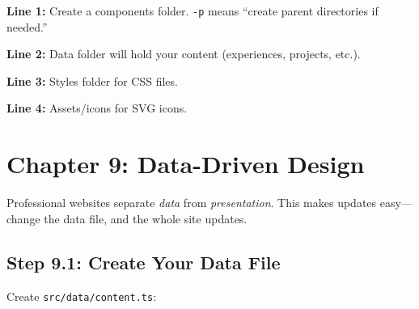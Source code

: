 \documentclass[12pt,a4paper]{article}
\begin{document}
\begin{explanation}
\textbf{Line 1:} Create a components folder. \texttt{-p} means ``create parent directories if needed.''

\textbf{Line 2:} Data folder will hold your content (experiences, projects, etc.).

\textbf{Line 3:} Styles folder for CSS files.

\textbf{Line 4:} Assets/icons for SVG icons.
\end{explanation}

\section{Chapter 9: Data-Driven Design}

Professional websites separate \textit{data} from \textit{presentation}. This makes updates easy---change the data file, and the whole site updates.

\subsection{Step 9.1: Create Your Data File}

Create \texttt{src/data/content.ts}:
\end{document}
